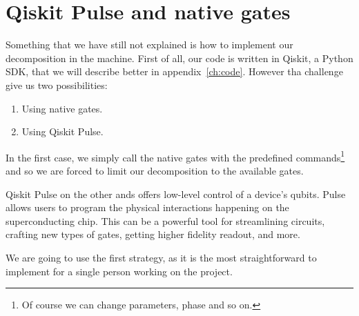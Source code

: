 \section{Qiskit Pulse and native gates}
Something that we have still not explained is how to implement our decomposition in the machine.
First of all, our code is written in Qiskit, a Python SDK, that we will describe better in appendix~\ref{ch:code}.
However tha challenge give us two possibilities:
\begin{enumerate}
\item Using native gates.
\item Using Qiskit Pulse.
\end{enumerate}

In the first case, we simply call the native gates with the predefined commands\footnote{Of course we can change parameters, phase and so on.} and so we are forced to limit our decomposition to the available gates.

Qiskit Pulse on the other ands offers low-level control of a device's qubits. Pulse allows users to program the physical interactions happening on the superconducting chip. This can be a powerful tool for streamlining circuits, crafting new types of gates, getting higher fidelity readout, and more.

We are going to use the first strategy, as it is the most straightforward to implement for a single person working on the project.
